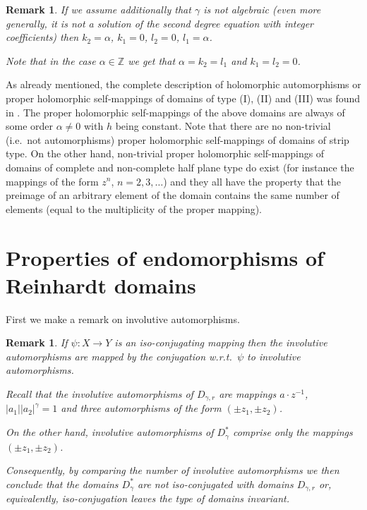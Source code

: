 \documentclass[a4paper,12pt]{amsart}
\newtheorem{remark}[theorem]{Remark}
\theoremstyle{definition}
\begin{document}
\begin{remark} If we assume additionally that $\gamma$ is not algebraic (even more generally, it is not a solution of the second degree equation with integer coefficients) then $k_2=\alpha$, $k_1=0$, $l_2=0$, $l_1=\alpha$.

Note that in the case $\alpha\in\mathbb Z$ we get that $\alpha=k_2=l_1$ and $k_1=l_2=0$. 
\end{remark}

As already mentioned, the complete description of holomorphic automorphisms or proper holomorphic self-mappings of domains of type (I), (II) and (III) was found in \cite{05208635}. The proper holomorphic self-mappings of the above domains are always of some order $\alpha \neq 0$ with $h$ being constant. Note that there are no non-trivial (i.e.\ not automorphisms) proper holomorphic self-mappings of domains of strip type. On the other hand, non-trivial proper holomorphic self-mappings of domains of complete and non-complete half plane type do exist (for instance the mappings of the form $z^n$, $n=2,3,\ldots$) and they all have the property that the preimage of an arbitrary element of the domain contains the same number of elements (equal to the multiplicity of the proper mapping).

\section{Properties of endomorphisms of Reinhardt domains}
First we make a remark on involutive automorphisms.

\begin{remark} If $\psi \colon X\to Y$ is an iso-conjugating mapping then the involutive automorphisms are mapped by the conjugation w.r.t.\  $\psi$ to involutive automorphisms. 

Recall that the involutive automorphisms of $D_{\gamma,r}$ are mappings $a\cdot z^{-1}$, $|a_1||a_2|^{\gamma}=1$ and three automorphisms of the form $(\pm z_1,\pm z_2)$.

On the other hand, involutive automorphisms of $D_{\gamma}^*$ comprise only the mappings $(\pm z_1,\pm z_2)$.

Consequently, by comparing the number of involutive automorphisms we then conclude that the domains $D_{\gamma}^*$ are not iso-conjugated with domains $D_{\gamma,r}$ or, equivalently, iso-conjugation leaves the type of domains invariant.
\end{remark}
\end{document}
